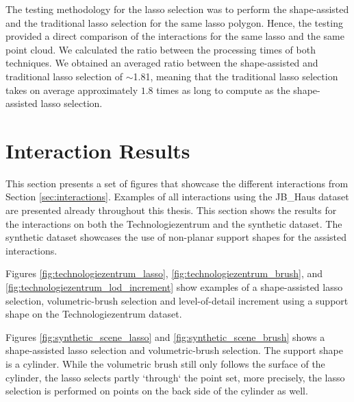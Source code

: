 The testing methodology for the lasso selection was to perform the shape-assisted and the traditional lasso selection for the same lasso polygon. Hence, the testing provided a direct comparison of the interactions for the same lasso and the same point cloud. We calculated the ratio between the processing times of both techniques. We obtained an averaged ratio between the shape-assisted and traditional lasso selection of $\sim$1.81, meaning that the traditional lasso selection takes on average approximately $1.8$ times as long to compute as the shape-assisted lasso selection. 


\section{Interaction Results}
\label{sec:interaction_results}

This section presents a set of figures that showcase the different interactions from Section \ref{sec:interactions}. Examples of all interactions using the JB\_Haus dataset are presented already throughout this thesis. This section shows the results for the interactions on both the Technologiezentrum and the synthetic dataset. The synthetic dataset showcases the use of non-planar support shapes for the assisted interactions. 

Figures \ref{fig:technologiezentrum_lasso}, \ref{fig:technologiezentrum_brush}, and \ref{fig:technologiezentrum_lod_increment} show examples of a shape-assisted lasso selection, volumetric-brush selection and level-of-detail increment using a support shape on the Technologiezentrum dataset. 

Figures \ref{fig:synthetic_scene_lasso} and \ref{fig:synthetic_scene_brush} shows a shape-assisted lasso selection and volumetric-brush selection. The support shape is a cylinder. While the volumetric brush still only follows the surface of the cylinder, the lasso selects partly `through` the point set, more precisely, the lasso selection is performed on points on the back side of the cylinder as well. 


